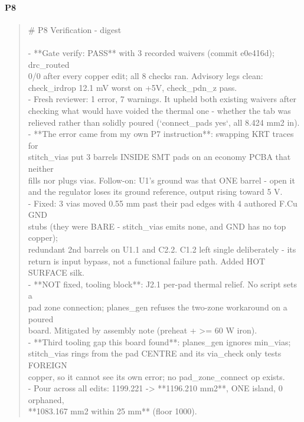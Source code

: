 \documentclass[11pt,a4paper]{article}
\begin{document}
\paragraph*{P8}
\begin{quote}\small\ttfamily\raggedright
\# P8 Verification - digest\\
~\\
- {*}{*}Gate verify: PASS{*}{*} with 3 recorded waivers (commit e0e416d); drc\_routed\\
  0/0 after every copper edit; all 8 checks ran. Advisory legs clean:\\
  check\_irdrop 12.1 mV worst on +5V, check\_pdn\_z pass.\\
- Fresh reviewer: 1 error, 7 warnings. It upheld both existing waivers after\\
  checking what would have voided the thermal one - whether the tab was\\
  relieved rather than solidly poured (`connect\_pads yes`, all 8.424 mm2 in).\\
- {*}{*}The error came from my own P7 instruction{*}{*}: swapping KRT traces for\\
  stitch\_vias put 3 barrels INSIDE SMT pads on an economy PCBA that neither\\
  fills nor plugs vias. Follow-on: U1's ground was that ONE barrel - open it\\
  and the regulator loses its ground reference, output rising toward 5 V.\\
- Fixed: 3 vias moved 0.55 mm past their pad edges with 4 authored F.Cu GND\\
  stubs (they were BARE - stitch\_vias emits none, and GND has no top copper);\\
  redundant 2nd barrels on U1.1 and C2.2. C1.2 left single deliberately - its\\
  return is input bypass, not a functional failure path. Added HOT SURFACE silk.\\
- {*}{*}NOT fixed, tooling block{*}{*}: J2.1 per-pad thermal relief. No script sets a\\
  pad zone connection; planes\_gen refuses the two-zone workaround on a poured\\
  board. Mitigated by assembly note (preheat + \textgreater{}= 60 W iron).\\
- {*}{*}Third tooling gap this board found{*}{*}: planes\_gen ignores min\_vias;\\
  stitch\_vias rings from the pad CENTRE and its via\_check only tests FOREIGN\\
  copper, so it cannot see its own error; no pad\_zone\_connect op exists.\\
- Pour across all edits: 1199.221 -\textgreater{} {*}{*}1196.210 mm2{*}{*}, ONE island, 0 orphaned,\\
  {*}{*}1083.167 mm2 within 25 mm{*}{*} (floor 1000).
\end{quote}
\end{document}
